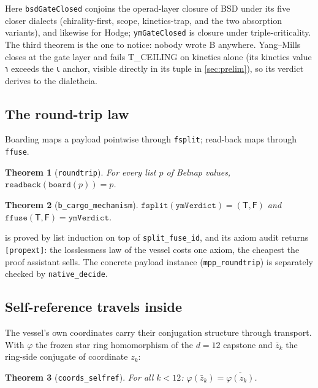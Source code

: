 \documentclass[12pt,a4paper]{article}
\newtheorem{theorem}{Theorem}[section]
\newcommand{\shav}[1]{{\shavfont #1}}
\newcommand{\bT}{\textsf{T}}
\newcommand{\bF}{\textsf{F}}
\newcommand{\bB}{\textsf{B}}
\begin{document}
Here \texttt{bsdGateClosed} conjoins the operad-layer closure of BSD under its
five closer dialects (chirality-first, scope, kinetics-trap, and the two
absorption variants), and likewise for Hodge; \texttt{ymGateClosed} is closure
under triple-criticality.  The third theorem is the one to notice: nobody wrote
\bB{} anywhere.  Yang--Mills closes at the gate layer and fails T\_CEILING on
kinetics alone (its kinetics value \shav{𐑪} exceeds the \shav{𐑧} anchor,
visible directly in its tuple in \cref{sec:prelim}), so its verdict derives to
the dialetheia.

\subsection{The round-trip law}

Boarding maps a payload pointwise through \texttt{fsplit}; read-back maps
through \texttt{ffuse}.

\begin{theorem}[\texttt{roundtrip}]
\label{thm:roundtrip}
For every list $p$ of Belnap values,
$\texttt{readback}(\texttt{board}(p)) = p$.
\end{theorem}

\begin{theorem}[\texttt{b\_cargo\_mechanism}]
$\texttt{fsplit}(\texttt{ymVerdict}) = (\bT, \bF)$ and
$\texttt{ffuse}(\bT, \bF) = \texttt{ymVerdict}$.
\end{theorem}

 is proved by list induction on top of
\texttt{split\_fuse\_id}, and its axiom audit returns \texttt{[propext]}: the
losslessness law of the vessel costs one axiom, the cheapest the proof assistant
sells.  The concrete payload instance (\texttt{mpp\_roundtrip}) is separately
checked by \texttt{native\_decide}.

\subsection{Self-reference travels inside}

The vessel's own coordinates carry their conjugation structure through
transport.  With $\varphi$ the frozen star ring homomorphism of the $d=12$
capstone and $\bar{z}_k$ the ring-side conjugate of coordinate $z_k$:

\begin{theorem}[\texttt{coords\_selfref}]
For all $k < 12$: $\varphi(\bar{z}_k) = \overline{\varphi(z_k)}$.
\end{theorem}
\end{document}
